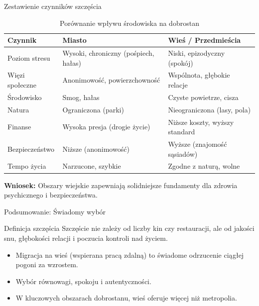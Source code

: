 \begin{frame}{Zestawienie czynników szczęścia \cite{link2, link3}}
    \begin{table}
        \centering
        \tiny
        \caption{Porównanie wpływu środowiska na dobrostan}
        \begin{tabular}{|l|p{3.5cm}|p{3.5cm}|}
            \hline
            \textbf{Czynnik} & \textbf{Miasto} & \textbf{Wieś / Przedmieścia} \\ \hline
            Poziom stresu & Wysoki, chroniczny (pośpiech, hałas) & Niski, epizodyczny (spokój) \\ \hline
            Więzi społeczne & Anonimowość, powierzchowność & Wspólnota, głębokie relacje \\ \hline
            Środowisko & Smog, hałas & Czyste powietrze, cisza \\ \hline
            Natura & Ograniczona (parki) & Nieograniczona (lasy, pola) \\ \hline
            Finanse & Wysoka presja (drogie życie) & Niższe koszty, wyższy standard \\ \hline
            Bezpieczeństwo & Niższe (anonimowość) & Wyższe (znajomość sąsiadów) \\ \hline
            Tempo życia & Narzucone, szybkie & Zgodne z naturą, wolne \\ \hline
        \end{tabular}
    \end{table}
    
    \vspace{0.2cm}
    \scriptsize
    \textbf{Wniosek:} Obszary wiejskie zapewniają solidniejsze fundamenty dla zdrowia psychicznego i bezpieczeństwa.
\end{frame}

\begin{frame}{Podsumowanie: Świadomy wybór}
    \begin{block}{Definicja szczęścia}
        Szczęście nie zależy od liczby kin czy restauracji, ale od jakości snu, głębokości relacji i poczucia kontroli nad życiem.
    \end{block}

    \begin{itemize}
        \item Migracja na wieś (wspierana pracą zdalną) to świadome odrzucenie ciągłej pogoni za wzrostem.
        \item Wybór równowagi, spokoju i autentyczności.
        \item W kluczowych obszarach dobrostanu, wieś oferuje więcej niż metropolia.
    \end{itemize}
\end{frame}